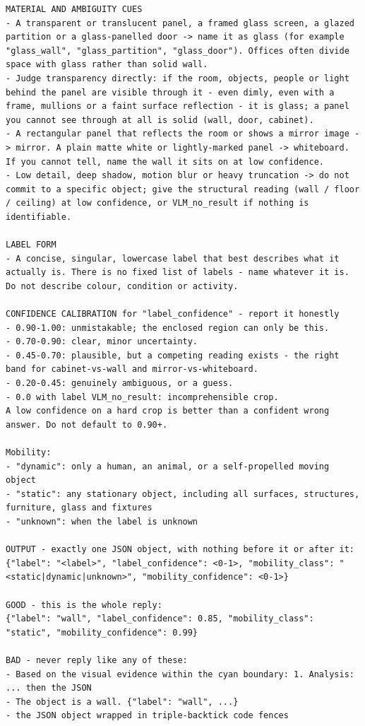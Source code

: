 \begin{lstlisting}[style=promptstyle]
MATERIAL AND AMBIGUITY CUES
- A transparent or translucent panel, a framed glass screen, a glazed partition or a glass-panelled door -> name it as glass (for example "glass_wall", "glass_partition", "glass_door"). Offices often divide space with glass rather than solid wall.
- Judge transparency directly: if the room, objects, people or light behind the panel are visible through it - even dimly, even with a frame, mullions or a faint surface reflection - it is glass; a panel you cannot see through at all is solid (wall, door, cabinet).
- A rectangular panel that reflects the room or shows a mirror image -> mirror. A plain matte white or lightly-marked panel -> whiteboard. If you cannot tell, name the wall it sits on at low confidence.
- Low detail, deep shadow, motion blur or heavy truncation -> do not commit to a specific object; give the structural reading (wall / floor / ceiling) at low confidence, or VLM_no_result if nothing is identifiable.

LABEL FORM
- A concise, singular, lowercase label that best describes what it actually is. There is no fixed list of labels - name whatever it is. Do not describe colour, condition or activity.

CONFIDENCE CALIBRATION for "label_confidence" - report it honestly
- 0.90-1.00: unmistakable; the enclosed region can only be this.
- 0.70-0.90: clear, minor uncertainty.
- 0.45-0.70: plausible, but a competing reading exists - the right band for cabinet-vs-wall and mirror-vs-whiteboard.
- 0.20-0.45: genuinely ambiguous, or a guess.
- 0.0 with label VLM_no_result: incomprehensible crop.
A low confidence on a hard crop is better than a confident wrong answer. Do not default to 0.90+.

Mobility:
- "dynamic": only a human, an animal, or a self-propelled moving object
- "static": any stationary object, including all surfaces, structures, furniture, glass and fixtures
- "unknown": when the label is unknown

OUTPUT - exactly one JSON object, with nothing before it or after it:
{"label": "<label>", "label_confidence": <0-1>, "mobility_class": "<static|dynamic|unknown>", "mobility_confidence": <0-1>}

GOOD - this is the whole reply:
{"label": "wall", "label_confidence": 0.85, "mobility_class": "static", "mobility_confidence": 0.99}

BAD - never reply like any of these:
- Based on the visual evidence within the cyan boundary: 1. Analysis: ... then the JSON
- The object is a wall. {"label": "wall", ...}
- the JSON object wrapped in triple-backtick code fences


\end{lstlisting}
